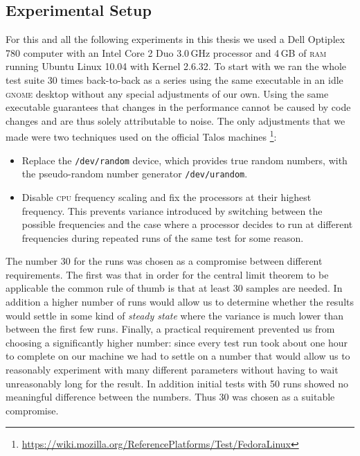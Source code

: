 \subsection{Experimental Setup} %
\label{sec:bg:setup}

For this and all the following experiments in this thesis we used a Dell
Optiplex 780 computer with an Intel Core 2 Duo 3.0\,GHz processor and 4\,GB of
\textsc{ram} running Ubuntu Linux 10.04 with Kernel 2.6.32. To start with we
ran the whole test suite 30 times back-to-back as a series using the same
executable in an idle \textsc{gnome} desktop without any special adjustments
of our own. Using the same executable guarantees that changes in the
performance cannot be caused by code changes and are thus solely attributable
to noise. The only adjustments that we made were two techniques used on the
official Talos machines%
\footnote{\url{https://wiki.mozilla.org/ReferencePlatforms/Test/FedoraLinux}}:

\begin{itemize}
    \item Replace the \texttt{/dev/random} device, which provides true random
        numbers, with the pseudo-random number generator
        \texttt{/dev/urandom}.
    \item Disable \textsc{cpu} frequency scaling and fix the processors at
        their highest frequency. This prevents variance introduced by
        switching between the possible frequencies and the case where a
        processor decides to run at different frequencies during repeated runs
        of the same test for some reason.
\end{itemize}

The number 30 for the runs was chosen as a compromise between different
requirements. The first was that in order for the central limit theorem to be
applicable the common rule of thumb is that at least 30 samples are needed. In
addition a higher number of runs would allow us to determine whether the
results would settle in some kind of \emph{steady state} where the variance is
much lower than between the first few runs. Finally, a practical requirement
prevented us from choosing a significantly higher number: since every test run
took about one hour to complete on our machine we had to settle on a number
that would allow us to reasonably experiment with many different parameters
without having to wait unreasonably long for the result. In addition initial
tests with 50 runs showed no meaningful difference between the numbers. Thus
30 was chosen as a suitable compromise.

